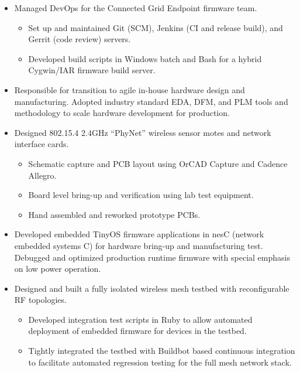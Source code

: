\documentclass[11pt,a4paper]{moderncv}
\begin{document}
{\begin{itemize}
    \begin{itemize}
    \item Designed sophisticated custom rack-mount chassis and internal backplane PCB with embedded Linux ARM controller, providing networked back-channel and instruction-level JTAG/SWD debug to every endpoint in the testbed.
    \item Modified Linux kernel source code and BSP to support custom backplane PCB hardware.
    \item Developed user space applications in C for CLI device control.
    \item Developed Python CGI web application for device management from a web browser.
    \end{itemize}
  \item Managed DevOps for the Connected Grid Endpoint firmware team.
    \begin{itemize}
    \item Set up and maintained Git (SCM), Jenkins (CI and release build), and Gerrit (code review) servers.
    \item Developed build scripts in Windows batch and Bash for a hybrid Cygwin/IAR firmware build server.
    \end{itemize}
  \end{itemize}
}
{
  \begin{itemize}
    \item Responsible for transition to agile in-house hardware design and manufacturing.  Adopted industry standard EDA, DFM, and PLM tools and methodology to scale hardware development for production.
    \item Designed 802.15.4 2.4GHz “PhyNet” wireless sensor motes and network interface cards.
      \begin{itemize}
        \item Schematic capture and PCB layout using OrCAD Capture and Cadence Allegro.
        \item Board level bring-up and verification using lab test equipment.
        \item Hand assembled and reworked prototype PCBs.
      \end{itemize}
    \item Developed embedded TinyOS firmware applications in nesC (network embedded systems C) for hardware bring-up and manufacturing test.  Debugged and optimized production runtime firmware with special emphasis on low power operation.
    \item Designed and built a fully isolated wireless mesh testbed with reconfigurable RF topologies.
    \begin{itemize}
      \item Developed integration test scripts in Ruby to allow automated deployment of embedded firmware for devices in the testbed.
      \item Tightly integrated the testbed with Buildbot based continuous integration to facilitate automated regression testing for the full mesh network stack.
    \end{itemize}
  \end{itemize}
}
\end{document}
